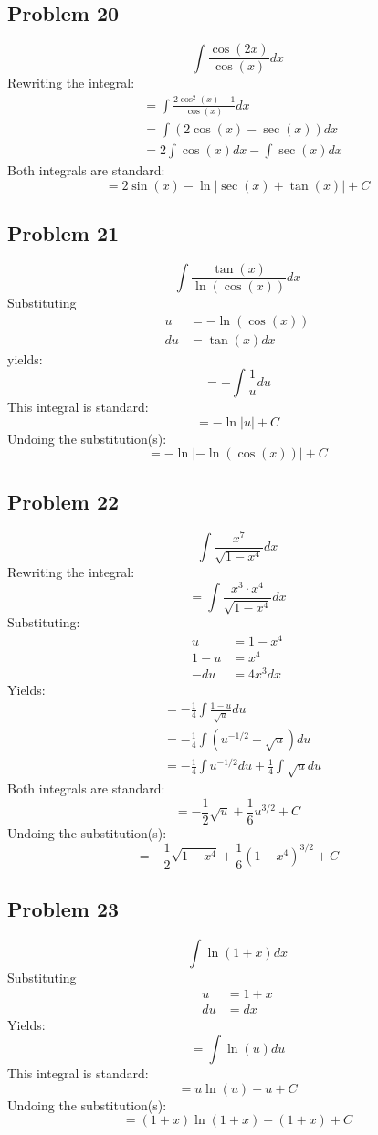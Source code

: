 \documentclass{article}
\begin{document}
\subsection*{Problem 20}
$$\int\frac{\cos\left(2x\right)}{\cos\left(x\right)}dx$$
Rewriting the integral:
\begin{align*}
&=\int\frac{2\cos^2(x)-1}{\cos(x)}dx \\
&=\int(2\cos(x)-\sec(x))dx \\
&=2\int\cos(x)dx-\int\sec(x)dx
\end{align*}
Both integrals are standard:
$$=2\sin(x)-\ln|\sec(x)+\tan(x)|+C$$
\subsection*{Problem 21}
$$\int\frac{\tan\left(x\right)}{\ln\left(\cos\left(x\right)\right)}dx$$
Substituting
\begin{align*}
u&=-\ln(\cos(x)) \\
du&=\tan(x)dx
\end{align*}
yields:
$$=-\int\frac{1}{u}du$$
This integral is standard:
$$=-\ln|u|+C$$
Undoing the substitution(s):
$$=-\ln\left|-\ln(\cos(x))\right|+C$$
\subsection*{Problem 22}
$$\int\frac{x^7}{\sqrt{1-x^4}}dx$$
Rewriting the integral:
$$=\int\frac{x^3\cdot x^4}{\sqrt{1-x^4}}dx$$
Substituting:
\begin{align*}
u&=1-x^4 \\
1-u&=x^4 \\
-du&=4x^3dx
\end{align*}
Yields:
\begin{align*}
&=-\frac{1}{4}\int\frac{1-u}{\sqrt{u}}du \\
&=-\frac{1}{4}\int\left(u^{-1/2}-\sqrt{u}\right)du \\
&=-\frac{1}{4}\int u^{-1/2}du+\frac{1}{4}\int\sqrt{u}du
\end{align*}
Both integrals are standard:
$$=-\frac{1}{2}\sqrt{u}+\frac{1}{6}u^{3/2}+C$$
Undoing the substitution(s):
$$=-\frac{1}{2}\sqrt{1-x^4}+\frac{1}{6}(1-x^4)^{3/2}+C$$
\subsection*{Problem 23}
$$\int\ln\left(1+x\right)dx$$
Substituting
\begin{align*}
u&=1+x \\
du&=dx 
\end{align*}
Yields:
$$=\int\ln(u)du$$
This integral is standard:
$$=u\ln(u)-u+C$$
Undoing the substitution(s):
$$=(1+x)\ln(1+x)-(1+x)+C$$
\end{document}
